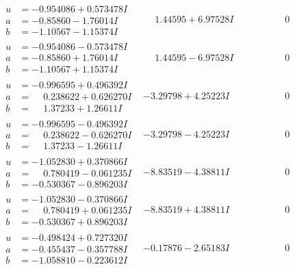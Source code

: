 \documentclass[1p]{elsarticle_modified}
\theoremstyle{definition}
\begin{document}
$$\begin{array}{c|c|c}
\begin{aligned}
u &= -0.954086 + 0.573478 I \\
a &= -0.85860 - 1.76014 I \\
b &= -1.10567 - 1.15374 I\end{aligned}
 & \phantom{-}1.44595 + 6.97528 I & \phantom{-0.000000 } 0 \\ \hline\begin{aligned}
u &= -0.954086 - 0.573478 I \\
a &= -0.85860 + 1.76014 I \\
b &= -1.10567 + 1.15374 I\end{aligned}
 & \phantom{-}1.44595 - 6.97528 I & \phantom{-0.000000 } 0 \\ \hline\begin{aligned}
u &= -0.996595 + 0.496392 I \\
a &= \phantom{-}0.238622 + 0.626270 I \\
b &= \phantom{-}1.37233 + 1.26611 I\end{aligned}
 & -3.29798 + 4.25223 I & \phantom{-0.000000 } 0 \\ \hline\begin{aligned}
u &= -0.996595 - 0.496392 I \\
a &= \phantom{-}0.238622 - 0.626270 I \\
b &= \phantom{-}1.37233 - 1.26611 I\end{aligned}
 & -3.29798 - 4.25223 I & \phantom{-0.000000 } 0 \\ \hline\begin{aligned}
u &= -1.052830 + 0.370866 I \\
a &= \phantom{-}0.780419 - 0.061235 I \\
b &= -0.530367 - 0.896203 I\end{aligned}
 & -8.83519 - 4.38811 I & \phantom{-0.000000 } 0 \\ \hline\begin{aligned}
u &= -1.052830 - 0.370866 I \\
a &= \phantom{-}0.780419 + 0.061235 I \\
b &= -0.530367 + 0.896203 I\end{aligned}
 & -8.83519 + 4.38811 I & \phantom{-0.000000 } 0 \\ \hline\begin{aligned}
u &= -0.498424 + 0.727320 I \\
a &= -0.455437 - 0.357788 I \\
b &= -1.058810 - 0.223612 I\end{aligned}
 & -0.17876 - 2.65183 I & \phantom{-0.000000 } 0\\

\end{array}$$
\end{document}
